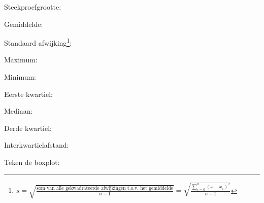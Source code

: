\documentclass[12pt,twoside]{article}
\begin{document}
Steekproefgrootte:\arulefill

Gemiddelde:\arulefill

Standaard afwijking\footnote{$s = \sqrt{\frac{\mbox{som van alle gekwadrateerde afwijkingen t.o.v. het gemiddelde}}{n-1}} = \sqrt{\frac{\sum_{i=0}^n(\bar{x}-x_i)^2}{n-1}}$}:\arulefill

Maximum:\arulefill

Minimum:\arulefill

Eerste kwartiel:\arulefill

Mediaan:\arulefill

Derde kwartiel:\arulefill

Interkwartielafstand:\arulefill

Teken de boxplot:

\ruitjes{3cm}
\end{document}
